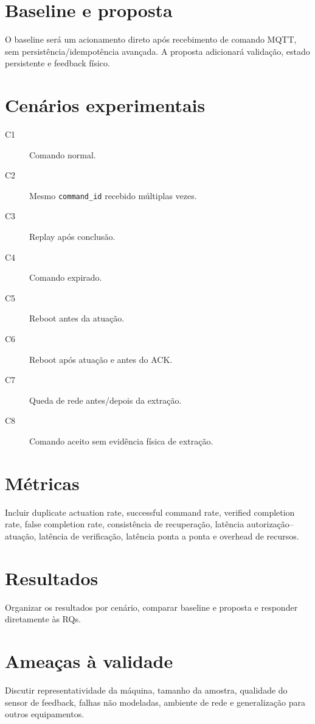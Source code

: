 \section{Baseline e proposta}
O baseline será um acionamento direto após recebimento de comando MQTT, sem persistência/idempotência avançada. A proposta adicionará validação, estado persistente e feedback físico.

\section{Cenários experimentais}
\begin{description}
\item[C1] Comando normal.
\item[C2] Mesmo \texttt{command\_id} recebido múltiplas vezes.
\item[C3] Replay após conclusão.
\item[C4] Comando expirado.
\item[C5] Reboot antes da atuação.
\item[C6] Reboot após atuação e antes do ACK.
\item[C7] Queda de rede antes/depois da extração.
\item[C8] Comando aceito sem evidência física de extração.
\end{description}

\section{Métricas}
Incluir duplicate actuation rate, successful command rate, verified completion rate, false completion rate, consistência de recuperação, latência autorização--atuação, latência de verificação, latência ponta a ponta e overhead de recursos.

\section{Resultados}
Organizar os resultados por cenário, comparar baseline e proposta e responder diretamente às RQs.

\section{Ameaças à validade}
Discutir representatividade da máquina, tamanho da amostra, qualidade do sensor de feedback, falhas não modeladas, ambiente de rede e generalização para outros equipamentos.
